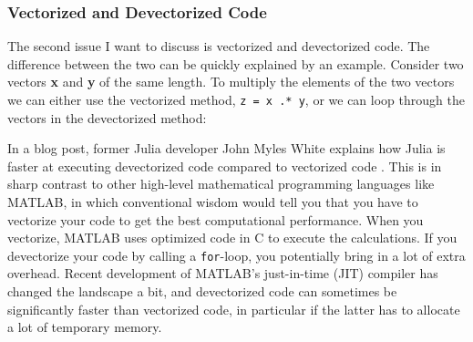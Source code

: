 \subsubsection{Vectorized and Devectorized Code}
The second issue I want to discuss is vectorized and devectorized code. The difference between the two can be quickly explained by an example. Consider two vectors \textbf{x} and \textbf{y} of the same length. To multiply the elements of the two vectors we can either use the vectorized method, \texttt{z = x .* y}, or we can loop through the vectors in the devectorized method:

In a blog post, former Julia developer John Myles White explains how Julia is faster at executing devectorized code compared to vectorized code \citep{Vectorization}. This is in sharp contrast to other high-level mathematical programming languages like MATLAB, in which conventional wisdom would tell you that you have to vectorize your code to get the best computational performance. When you vectorize, MATLAB uses optimized code in C to execute the calculations. If you devectorize your code by calling a \texttt{for}-loop, you potentially bring in a lot of extra overhead. Recent development of MATLAB's just-in-time (JIT) compiler has changed the landscape a bit, and devectorized code can sometimes be significantly faster than vectorized code, in particular if the latter has to allocate a lot of temporary memory. 


